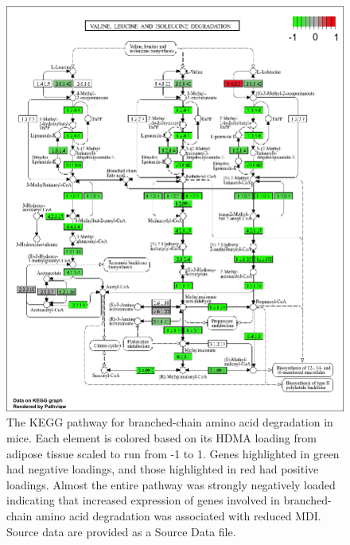 \documentclass[
]{article}
\begin{document}
\begin{figure}[ht!]
\includegraphics[width=\textwidth]{Figures/Supp_Fig_Branched_Chain.png} 
\caption{The KEGG pathway for branched-chain amino acid degradation in 
mice. Each element is colored based on its HDMA loading from adipose
tissue scaled to run from -1 to 1. Genes highlighted in green had 
negative loadings, and those highlighted in red had positive loadings. 
Almost the entire pathway was strongly negatively loaded indicating 
that increased expression of genes involved in branched-chain amino acid 
degradation was associated with reduced MDI. Source data are provided as 
a Source Data file.
}
\label{fig:bcaa_degradation}
\end{figure}
\end{document}
